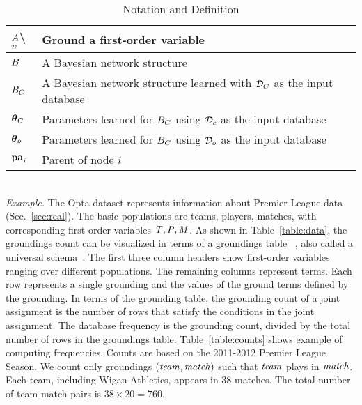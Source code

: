{{\begin{table}
{\begin{tabular}{|l|l|}
 	 	      			$A$\textbackslash$v$& Ground a first-order variable\\\hline
 	 	      			
 	 	      			$B$&A Bayesian network structure\\\hline
 	 	      			$B_{C}$ & A Bayesian network structure learned with $\mathcal{D}_{C}$ as the input database\\\hline
 	 	      			$\boldsymbol{\theta}_{C}$ & Parameters learned for $B_{C}$ using $\mathcal{D}_{c}$  as the input database\\\hline
 	 	      			$\boldsymbol{\theta}_{o}$ & Parameters learned for $B_{C}$ using $\mathcal{D}_{o}$  as the input database\\\hline
 	 	      			$\mathbf{pa}_{i}$&Parent of node $i$\\\hline
 	 	      		\end{tabular}} 	\caption[Table of Notations]{Notation and Definition	\label{table:notation}}
 	 	      	\end{table}\\
\emph{Example.} \label{sec:example}
%
The Opta dataset represents information about Premier League data %
(Sec.~\ref{sec:real}). 
The basic populations are teams, players, matches, with 
corresponding first-order variables $\it{T}, \it{P}, \it{M}$. As shown in Table~\ref{table:data}, the groundings count can be visualized in terms of a groundings table ~\cite{Schulte2012}, also called a universal schema~\cite{Riedel2013}. 
The first three column headers show first-order variables ranging over different populations. The remaining columns represent terms. Each row represents a single grounding and the values of the ground terms defined by the grounding.
In terms of the grounding table, the grounding count of a joint assignment is the number of rows that satisfy the conditions in the joint assignment. The database frequency is the grounding count, divided by the total number of rows in the groundings table. Table~\ref{table:counts} shows example of computing frequencies. Counts are based on the 2011-2012 Premier League Season. We count only groundings $(\it{team},\it{match})$ such that $\it{team}$ plays in $\it{match}$. Each team, including Wigan Athletics, appears in 38 matches. The total number of team-match pairs is $38 \times 20 = 760$.

}}
